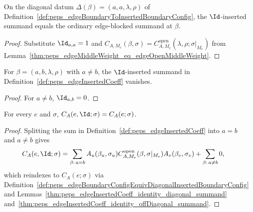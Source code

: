\begin{lemma}%
    \label{thm:peps_edgeInsertedCoeff_identity_diagonal_summand}
    \leanok
    On the diagonal datum $\Delta(\beta)=(a,a,\lambda,\rho)$ of
    Definition~\ref{def:peps_edgeBoundaryToInsertedBoundaryConfig}, the
    $\Id$-inserted summand equals the ordinary edge-blocked summand at $\beta$.
\end{lemma}
\begin{proof}\leanok
    Substitute $\Id_{a,a}=1$ and
    $C_{A,M_e}(\beta,\sigma)=C^{\mathrm{open}}_{A,M_e}(\lambda,\rho;\sigma|_{M_e})$
    from Lemma~\ref{thm:peps_edgeMiddleWeight_eq_edgeOpenMiddleWeight}.
\end{proof}

\begin{lemma}%
    \label{thm:peps_edgeInsertedCoeff_identity_offDiagonal_summand}
    \leanok
    For $\beta=(a,b,\lambda,\rho)$ with $a\ne b$, the $\Id$-inserted summand in
    Definition~\ref{def:peps_edgeInsertedCoeff} vanishes.
\end{lemma}
\begin{proof}\leanok
    For $a\ne b$, $\Id_{a,b}=0$.
\end{proof}

\begin{lemma}%
    \label{thm:peps_edgeInsertedCoeff_identity}
    \leanok
    For every $e$ and $\sigma$, $C_A(e,\Id;\sigma)=C_A(e;\sigma)$.
\end{lemma}
\begin{proof}\leanok
    Splitting the sum in Definition~\ref{def:peps_edgeInsertedCoeff} into
    $a=b$ and $a\ne b$ gives
    \begin{align}
        C_A(e,\Id;\sigma)
         & =
        \sum_{\beta:\,a=b}
        A_u(\beta_u,\sigma_u)
        C^{\mathrm{open}}_{A,M_e}(\beta,\sigma|_{M_e})
        A_v(\beta_v,\sigma_v)
        +\sum_{\beta:\,a\ne b}0,
        \notag
    \end{align}
    which reindexes to $C_A(e;\sigma)$ via
    Definition~\ref{def:peps_edgeBoundaryConfigEquivDiagonalInsertedBoundaryConfig}
    and Lemmas~\ref{thm:peps_edgeInsertedCoeff_identity_diagonal_summand}
    and~\ref{thm:peps_edgeInsertedCoeff_identity_offDiagonal_summand}.
\end{proof}


